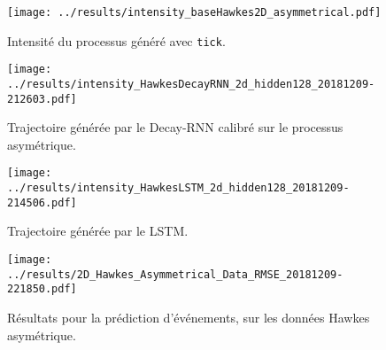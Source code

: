 \documentclass[../main.tex]{subfiles}
\begin{document}
\begin{frame}
\begin{figure}
	\texttt{[image: ../results/intensity\_baseHawkes2D\_asymmetrical.pdf]}
	\caption{Intensité du processus généré avec \texttt{tick}.}
\end{figure}
\end{frame}

\begin{frame}
\begin{figure}
	\texttt{[image: ../results/intensity\_HawkesDecayRNN\_2d\_hidden128\_20181209-212603.pdf]}
	\caption{Trajectoire générée par le Decay-RNN calibré sur le processus asymétrique.}	
\end{figure}
\end{frame}

\begin{frame}
\begin{figure}
	\texttt{[image: ../results/intensity\_HawkesLSTM\_2d\_hidden128\_20181209-214506.pdf]}
	\caption{Trajectoire générée par le LSTM.}
\end{figure}
\end{frame}

\begin{frame}
\begin{figure}
	\texttt{[image: ../results/2D\_Hawkes\_Asymmetrical\_Data\_RMSE\_20181209-221850.pdf]}
	\caption{Résultats pour la prédiction d'événements, sur les données Hawkes asymétrique.}
\end{figure}
\end{frame}
\end{document}
